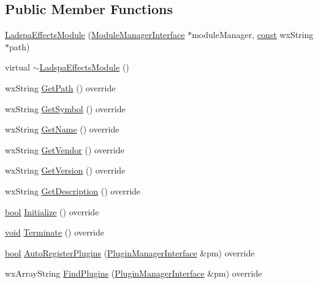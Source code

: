 \subsection*{Public Member Functions}
\begin{DoxyCompactItemize}
\item 
\hyperlink{class_ladspa_effects_module_abfb931a8bd4483fb719d76d6729d0099}{Ladspa\+Effects\+Module} (\hyperlink{class_module_manager_interface}{Module\+Manager\+Interface} $\ast$module\+Manager, \hyperlink{getopt1_8c_a2c212835823e3c54a8ab6d95c652660e}{const} wx\+String $\ast$path)
\item 
virtual \hyperlink{class_ladspa_effects_module_a51deaf20292e4444a722bb36437f75b3}{$\sim$\+Ladspa\+Effects\+Module} ()
\item 
wx\+String \hyperlink{class_ladspa_effects_module_ac97038b34f6237e65f9416c9fa07e656}{Get\+Path} () override
\item 
wx\+String \hyperlink{class_ladspa_effects_module_ad15876ee38a6d4434951c86cfec78dc6}{Get\+Symbol} () override
\item 
wx\+String \hyperlink{class_ladspa_effects_module_afe847281b48ed240ba50fccc81f141af}{Get\+Name} () override
\item 
wx\+String \hyperlink{class_ladspa_effects_module_ab4355feb7513a391dd346e1e52b7fe51}{Get\+Vendor} () override
\item 
wx\+String \hyperlink{class_ladspa_effects_module_aff740ff07423307352d63905a52468e3}{Get\+Version} () override
\item 
wx\+String \hyperlink{class_ladspa_effects_module_afada0a3f9cc2aa2dbee80e18141872f1}{Get\+Description} () override
\item 
\hyperlink{mac_2config_2i386_2lib-src_2libsoxr_2soxr-config_8h_abb452686968e48b67397da5f97445f5b}{bool} \hyperlink{class_ladspa_effects_module_add0086a25da0d78f2a8accdccbce43ba}{Initialize} () override
\item 
\hyperlink{sound_8c_ae35f5844602719cf66324f4de2a658b3}{void} \hyperlink{class_ladspa_effects_module_acf34ea49ec0af081fcda4765b2823292}{Terminate} () override
\item 
\hyperlink{mac_2config_2i386_2lib-src_2libsoxr_2soxr-config_8h_abb452686968e48b67397da5f97445f5b}{bool} \hyperlink{class_ladspa_effects_module_af936d962de58bb588779bd6df4a85277}{Auto\+Register\+Plugins} (\hyperlink{class_plugin_manager_interface}{Plugin\+Manager\+Interface} \&pm) override
\item 
wx\+Array\+String \hyperlink{class_ladspa_effects_module_ac8acc889fd29fc0f993a3b1973cec708}{Find\+Plugins} (\hyperlink{class_plugin_manager_interface}{Plugin\+Manager\+Interface} \&pm) override

\end{DoxyCompactItemize}
